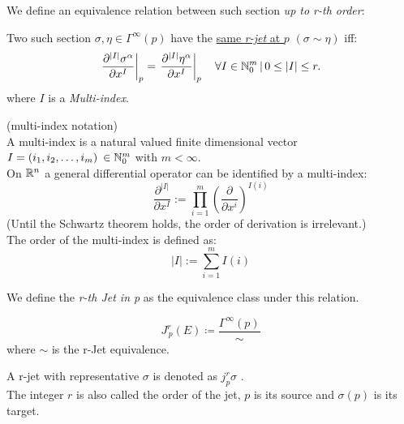 \documentclass[a4paper,12pt]{scrartcl}    %
\begin{document}
We define an equivalence relation between such section \emph{up to r-th order}:
	\begin{definition}
	Two such section $\sigma, \eta \in \Gamma^\infty(p)$ have the \underline{same \emph{r-jet} at $p$} $(\sigma \sim \eta)$ iff:
	\begin{displaymath}
		\left.\frac{\partial^{|I|} \sigma^{\alpha}}{\partial x^{I}}\right|_{p} = \left.\frac{\partial^{|I|} \eta^{\alpha}}{\partial x^{I}}\right|_{p} \quad \forall I\in \mathbb{N}^m_0 \, \vert \, 0 \leq |I| \leq r.
	\end{displaymath}	
	where $I$ is a \emph{Multi-index}.	
	\end{definition}
	\begin{remark}
	(multi-index notation)
	\\
	A multi-index is a natural valued finite dimensional vector  $I=(i_1, i_2, \ldots, i_m)\: \in \mathbb{N}^m_0$ with $m<\infty$.
	\\
	On $\mathbb{R}^n$ a general differential operator can be identified by a multi-index:
		\begin{displaymath}
			\frac{\partial^{|I|}}{\partial x^{I}} := \prod_{i=1}^{m} \left( \frac{\partial}{\partial x^{i}} \right)^{I(i)}
		\end{displaymath}
	(Until the Schwartz theorem holds, the order of derivation is irrelevant.)
	\\
	The order of the multi-index is defined as:
		\begin{displaymath}
			|I| := \sum_{i=1}^{m} I(i)
		\end{displaymath}
	\end{remark}
	
	We define the \emph{r-th Jet in p} as the equivalence class under this relation.
	\begin{definition}
		\begin{displaymath}
			J^r_{\,p}(E) \coloneqq \frac{\Gamma^\infty(p)}{\sim}
		\end{displaymath}
		where $\sim$ is the r-Jet equivalence.
	\end{definition}
	\begin{notationfix} 
		A r-jet with representative $\sigma$ is denoted as $j^r_p\sigma$ . 
		\\
		The integer $r$ is also called the order of the jet, $p$ is its source and $\sigma(p)$ is its target.
	\end{notationfix}
	
\end{document}
